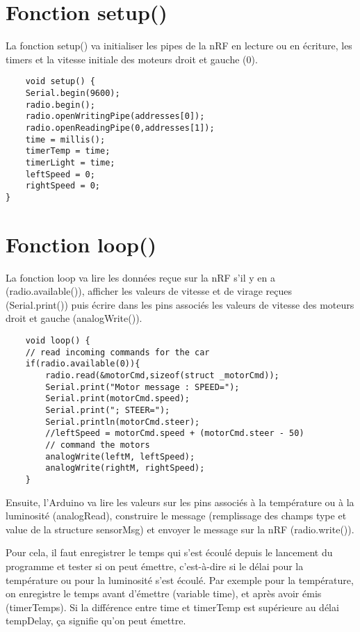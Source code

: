 \section{Fonction setup()}

La fonction setup() va initialiser les pipes de la nRF en lecture ou en écriture, 
les timers et la vitesse initiale des moteurs droit et gauche (0). 

\bigbreak
\begin{DDbox}{\linewidth}
\begin{lstlisting}
	void setup() {
	Serial.begin(9600);
	radio.begin();
	radio.openWritingPipe(addresses[0]);
	radio.openReadingPipe(0,addresses[1]);
	time = millis();
	timerTemp = time;
	timerLight = time;
	leftSpeed = 0;
	rightSpeed = 0;
}
\end{lstlisting}
\end{DDbox}



\section{Fonction loop()}

La fonction loop va lire les données reçue sur la nRF s'il y en a (radio.available()), afficher 
les valeurs de vitesse et de virage reçues (Serial.print()) puis écrire dans les pins associés 
les valeurs de vitesse des moteurs droit et gauche (analogWrite()).

\bigbreak
\begin{DDbox}{\linewidth}
\begin{lstlisting}
	void loop() {
	// read incoming commands for the car
	if(radio.available(0)){
		radio.read(&motorCmd,sizeof(struct _motorCmd));
		Serial.print("Motor message : SPEED=");
		Serial.print(motorCmd.speed);
		Serial.print("; STEER=");
		Serial.println(motorCmd.steer);
		//leftSpeed = motorCmd.speed + (motorCmd.steer - 50)
		// command the motors
		analogWrite(leftM, leftSpeed);
		analogWrite(rightM, rightSpeed);
	}

\end{lstlisting}
\end{DDbox}

Ensuite, l'Arduino va lire les valeurs sur les pins associés à la température ou à la
luminosité (analogRead), construire le message (remplissage des champs type et value
de la structure sensorMsg) et envoyer le message sur la nRF (radio.write()).

Pour cela, il faut enregistrer le temps qui s'est écoulé depuis le lancement du programme
et tester si on peut émettre, c'est-à-dire si le délai pour la température ou pour la
luminosité s'est écoulé. Par exemple pour la température, on enregistre le temps avant 
d'émettre (variable time), et après avoir émis (timerTemps). 
Si la différence entre time et timerTemp est supérieure au délai tempDelay, ça signifie qu'on
peut émettre.\\


